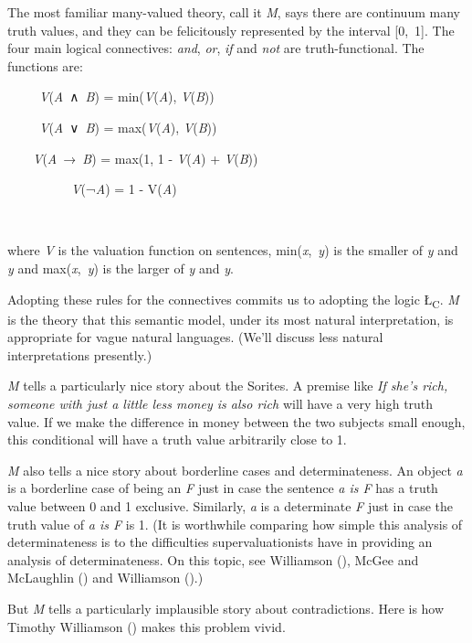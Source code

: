 \documentclass[
  10pt,
  letterpaper,
  DIV=11,
  numbers=noendperiod,
  twoside]{scrartcl}
\begin{document}
The most familiar many-valued theory, call it \emph{M}, says there are
continuum many truth values, and they can be felicitously represented by
the interval {[}0,~1{]}. The four main logical connectives: \emph{and},
\emph{or}, \emph{if} and \emph{not} are truth-functional. The functions
are:

~~~~~\emph{V}(\emph{A}~∧~\emph{B}) = min(\emph{V}(\emph{A}),
\emph{V}(\emph{B}))\\
\strut ~~~~~\emph{V}(\emph{A}~∨~\emph{B}) = max(\emph{V}(\emph{A}),
\emph{V}(\emph{B}))\\
\strut ~~~~\emph{V}(\emph{A}~→~\emph{B}) = max(1, 1 - \emph{V}(\emph{A})
+ \emph{V}(\emph{B}))\\
\strut ~~~~~~~~~~\emph{V}(¬\emph{A}) = 1 - V(\emph{A})\\
\strut ~~~

where \emph{V} is the valuation function on sentences,
min(\emph{x},~\emph{y}) is the smaller of \emph{y} and \emph{y} and
max(\emph{x},~\emph{y}) is the larger of \emph{y} and \emph{y}.

Adopting these rules for the connectives commits us to adopting the
logic Ł\textsubscript{C}. \emph{M} is the theory that this semantic
model, under its most natural interpretation, is appropriate for vague
natural languages. (We'll discuss less natural interpretations
presently.)

\emph{M} tells a particularly nice story about the Sorites. A premise
like \emph{If she's rich, someone with just a little less money is also
rich} will have a very high truth value. If we make the difference in
money between the two subjects small enough, this conditional will have
a truth value arbitrarily close to 1.

\emph{M} also tells a nice story about borderline cases and
determinateness. An object \emph{a} is a borderline case of being an
\emph{F} just in case the sentence \emph{a is F} has a truth value
between 0 and 1 exclusive. Similarly, \emph{a} is a determinate \emph{F}
just in case the truth value of \emph{a is F} is 1. (It is worthwhile
comparing how simple this analysis of determinateness is to the
difficulties supervaluationists have in providing an analysis of
determinateness. On this topic, see Williamson
(), McGee and McLaughlin
() and Williamson
().)

But \emph{M} tells a particularly implausible story about
contradictions. Here is how Timothy Williamson
() makes this problem vivid.
\end{document}
